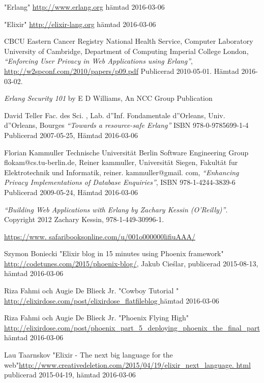 \documentclass[12pt]{article}
\begin{document}
\begin{thebibliography}{99}

	"Erlang" \url{http://www.erlang.org}
hämtad 2016-03-06

"Elixir" \url{http://elixir-lang.org}
hämtad 2016-03-06

 CBCU Eastern Cancer Registry National Health Service, Computer Laboratory University of Cambridge, Department of Computing Imperial College London, {\em “Enforcing User Privacy in Web Applications using Erlang”}, \url{http://w2spconf.com/2010/papers/p09.pdf} Publicerad 2010-05-01.
 Hämtad 2016-03-02.


 {\em Erlang Security 101} by E D Williams, An NCC Group Publication


David Teller Fac.
 des Sci.
, Lab.
 d''Inf.
 Fondamentale d''Orleans, Univ.
 d''Orleans, Bourges {\em “Towards a resource-safe Erlang”} ISBN 978-0-9785699-1-4 Publicerad 2007-05-25, Hämtad 2016-03-06			
					
Florian Kammuller Technische Universität Berlin Software Engineering Group flokam@cs.tu-berlin.de, Reiner kammuller, Universität Siegen, Fakultät fur Elektrotechnik und Informatik, reiner.
kammuller@gmail.
com, {\em “Enhancing Privacy Implementations of Database Enquiries”}, ISBN 978-1-4244-3839-6 Publicerad 2009-05-24, Hämtad 2016-03-06


 {\em “Building Web Applications with Erlang by Zachary Kessin (O’Reilly)”}.
 Copyright 2012 Zachary Kessin, 978-1-449-30996-1.

\url{https://www.
safaribooksonline.com/u/001o000000lifiuAAA/}

 Szymon Boniecki "Elixir blog in 15 minutes using Phoenix framework" \url{http://codetunes.com/2015/phoenix-blog/}, Jakub Cieślar, publicerad 2015-08-13,
hämtad 2016-03-06

Riza Fahmi och Augie De Blieck Jr.
 "Cowboy Tutorial " \url{http://elixirdose.com/post/elixirdose_flatfileblog }
hämtad 2016-03-06

Riza Fahmi och Augie De Blieck Jr.
  "Phoenix Flying High" \url{http://elixirdose.com/post/phoenix_part_5_deploying_phoenix_the_final_part} 
hämtad 2016-03-06

 Lau Taarnskov "Elixir - The next big language for the web"\url{http://www.creativedeletion.com/2015/04/19/elixir_next_language.
html}
publicerad  2015-04-19,
hämtad 2016-03-06




\end{thebibliography}
\end{document}

